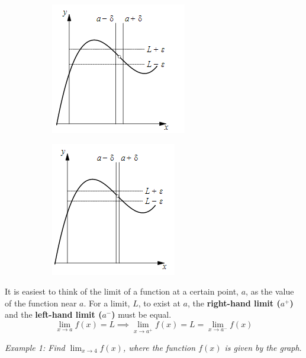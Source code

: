 \documentclass{article}
\begin{document}
            \begin{figure} [hbt!]
                \centering
                \begin{subfigure}[b]{.45\textwidth}
                    \includegraphics{Resources/Unit1Limits/limit1.PNG}
                \end{subfigure}
                \begin{subfigure}[b]{.45\textwidth}
                    \includegraphics{Resources/Unit1Limits/limit2.PNG}
                \end{subfigure}
            \end{figure}

            \noindent It is easiest to think of the limit of a function at a certain point, $a$,
            as the value of the function near $a$. For a limit, $L$, to exist at $a$, the
            \textbf{right-hand limit ($a^+$)} and the \textbf{left-hand limit ($a^-$)} must be equal. \\

            \begin{equation*}
                \lim_{x \to a} f(x) = L \implies \lim_{x \to a^+} f(x) = L = \lim_{x \to a^-} f(x)
            \end{equation*}

            \noindent \color{blue} \textit{Example 1: Find $\lim_{x\to 4}f(x)$, where the function
            $f(x)$ is given by the graph}. \color{black} \\
\end{document}
